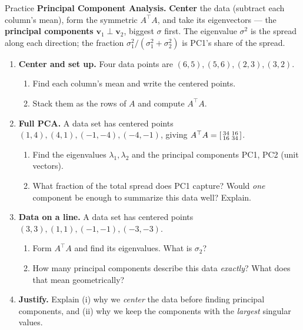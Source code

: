 \documentclass[10pt]{article}
\newcommand{\vv}{\mathbf{v}}
\newcommand{\T}{^{\top}}
\begin{document}
\namedateperiod

\vspace{0.12in}

\begin{notesbox}{Practice}
\textbf{Principal Component Analysis.} \textbf{Center} the data (subtract each column's mean), form the
symmetric $A\T A$, and take its eigenvectors --- the \textbf{principal components} $\vv_1\perp\vv_2$, biggest
$\sigma$ first. The eigenvalue $\sigma^2$ is the spread along each direction; the fraction
$\sigma_1^2/(\sigma_1^2+\sigma_2^2)$ is PC1's share of the spread.

\begin{enumerate}[leftmargin=1.9em, itemsep=12pt]
  \item \textbf{Center and set up.} Four data points are $(6,5),(5,6),(2,3),(3,2)$.
    \begin{enumerate}[label=(\alph*), leftmargin=1.8em, itemsep=3pt]
      \item Find each column's mean and write the centered points.
      \item Stack them as the rows of $A$ and compute $A\T A$.
    \end{enumerate}
    \vspace{1.7cm}
  \item \textbf{Full PCA.} A data set has centered points $(1,4),(4,1),(-1,-4),(-4,-1)$, giving
        $A\T A=\begin{bsmallmatrix} 34 & 16\\ 16 & 34 \end{bsmallmatrix}$.
    \begin{enumerate}[label=(\alph*), leftmargin=1.8em, itemsep=3pt]
      \item Find the eigenvalues $\lambda_1,\lambda_2$ and the principal components PC1, PC2 (unit vectors).
      \item What fraction of the total spread does PC1 capture? Would \emph{one} component be enough to summarize this data well? Explain.
    \end{enumerate}
    \vspace{2.6cm}
  \item \textbf{Data on a line.} A data set has centered points $(3,3),(1,1),(-1,-1),(-3,-3)$.
    \begin{enumerate}[label=(\alph*), leftmargin=1.8em, itemsep=3pt]
      \item Form $A\T A$ and find its eigenvalues. What is $\sigma_2$?
      \item How many principal components describe this data \emph{exactly}? What does that mean geometrically?
    \end{enumerate}
    \vspace{1.7cm}
  \item \textbf{Justify.} Explain (i) why we \emph{center} the data before finding principal components, and (ii) why we keep the components with the \emph{largest} singular values. 
\end{enumerate}
\end{notesbox}
\end{document}
